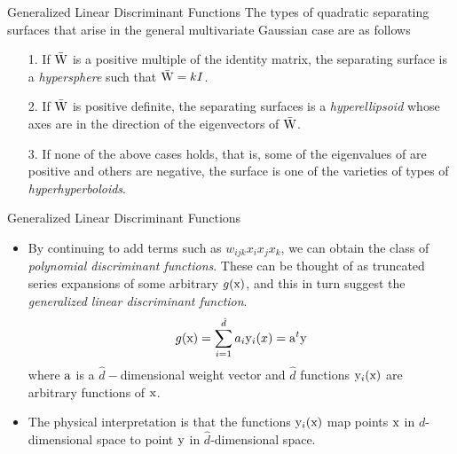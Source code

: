 \begin{frame}{Generalized Linear Discriminant Functions}
The types of quadratic separating surfaces that arise in the general multivariate Gaussian case are as follows
\begin{itemize}
\item[1.] If $\bar{\rm W}$ is a positive multiple of the identity matrix, the separating surface is a \textit{\color{slidecolor}hypersphere} such that $\bar{\rm W}=kI$.
\item[2.] If $\bar{\rm W}$ is positive definite, the separating surfaces is a \textit{\color{slidecolor}hyperellipsoid} whose axes are in the direction of the eigenvectors of $\bar{\rm W}$.
\item[3.] If none of the above cases holds, that is, some of the eigenvalues of are positive and others are negative,
the surface is one of the varieties of types of \textit{\color{slidecolor}hyperhyperboloids}.
\end{itemize}
\end{frame}

\begin{frame}{Generalized Linear Discriminant Functions}
\begin{itemize}
\item By continuing to add terms such as $w_{ijk}x_ix_jx_k$, we can obtain the class of \textit{\color{slidecolor}polynomial discriminant functions}.
These can be thought of as truncated series expansions of some arbitrary $g ( {\rm x} )$, and this in turn suggest the
\textit{\color{slidecolor}generalized linear discriminant function}.
\begin{equation}
g({\rm x}) = \sum\limits_{i = 1}^{\hat d} {{a_i}{{\rm y}_i}(x) = {{\rm a}^t}{\rm y}} \nonumber
\end{equation}
where ${\rm a}$ is a $\hat{d}-$dimensional weight vector and $\hat{d}$ functions ${\rm y}_i({\rm x})$ are arbitrary functions of ${\rm x}$.
\item The physical interpretation is that the functions ${\rm y}_i({\rm x})$ map points ${\rm x}$ in $d$-dimensional space to point ${\rm y}$ in $\hat{d}$-dimensional space.
\end{itemize}
\end{frame}

